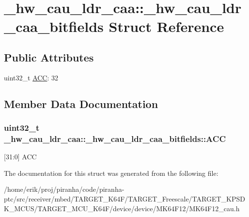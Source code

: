 \hypertarget{struct__hw__cau__ldr__caa_1_1__hw__cau__ldr__caa__bitfields}{}\section{\+\_\+hw\+\_\+cau\+\_\+ldr\+\_\+caa\+:\+:\+\_\+hw\+\_\+cau\+\_\+ldr\+\_\+caa\+\_\+bitfields Struct Reference}
\label{struct__hw__cau__ldr__caa_1_1__hw__cau__ldr__caa__bitfields}
\subsection*{Public Attributes}
\begin{DoxyCompactItemize}
\item 
uint32\+\_\+t \hyperlink{struct__hw__cau__ldr__caa_1_1__hw__cau__ldr__caa__bitfields_a760875b8d06280627b5eb64c1ad2e816}{A\+CC}\+: 32
\end{DoxyCompactItemize}


\subsection{Member Data Documentation}
\subsubsection[{\texorpdfstring{A\+CC}{ACC}}]{\setlength{\rightskip}{0pt plus 5cm}uint32\+\_\+t \+\_\+hw\+\_\+cau\+\_\+ldr\+\_\+caa\+::\+\_\+hw\+\_\+cau\+\_\+ldr\+\_\+caa\+\_\+bitfields\+::\+A\+CC}\hypertarget{struct__hw__cau__ldr__caa_1_1__hw__cau__ldr__caa__bitfields_a760875b8d06280627b5eb64c1ad2e816}{}\label{struct__hw__cau__ldr__caa_1_1__hw__cau__ldr__caa__bitfields_a760875b8d06280627b5eb64c1ad2e816}
\mbox{[}31\+:0\mbox{]} A\+CC 

The documentation for this struct was generated from the following file\+:\begin{DoxyCompactItemize}
\item 
/home/erik/proj/piranha/code/piranha-\/ptc/src/receiver/mbed/\+T\+A\+R\+G\+E\+T\+\_\+\+K64\+F/\+T\+A\+R\+G\+E\+T\+\_\+\+Freescale/\+T\+A\+R\+G\+E\+T\+\_\+\+K\+P\+S\+D\+K\+\_\+\+M\+C\+U\+S/\+T\+A\+R\+G\+E\+T\+\_\+\+M\+C\+U\+\_\+\+K64\+F/device/device/\+M\+K64\+F12/M\+K64\+F12\+\_\+cau.\+h\end{DoxyCompactItemize}
